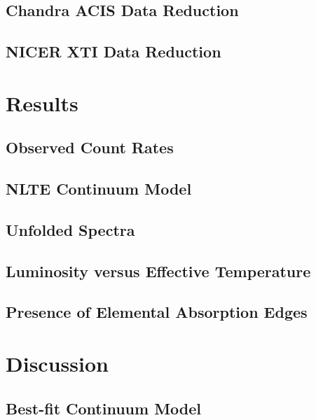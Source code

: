     	\subsection{Chandra ACIS Data Reduction} \label{multi-obs:red-analysis:acis}
    	
    	\subsection{NICER XTI Data Reduction} \label{multi-obs:red-analysis:xti}
    	
    \section{Results} \label{multi-obs:results}
    
    	\subsection{Observed Count Rates} \label{multi-obs:results:count-rates}
    	
    	\subsection{NLTE Continuum Model} \label{multi-obs:results:nlte}
    	
    	\subsection{Unfolded Spectra} \label{multi-obs:results:unfolded}
    	
    	\subsection{Luminosity versus Effective Temperature} \label{multi-obs:results:L-vs-Teff}
    	
    	\subsection{Presence of Elemental Absorption Edges} \label{multi-obs:results:abs-edge}
    	
    \section{Discussion} \label{multi-obs:discussion}
    
    	\subsection{Best-fit Continuum Model} \label{multi-obs:discussion:cont-mod}
    	
